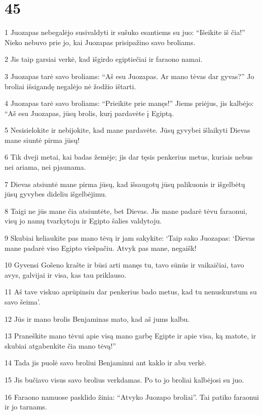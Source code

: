 \chapter{45}

\par 1 Juozapas nebegalėjo susivaldyti ir sušuko esantiems su juo: “Išeikite iš čia!” Nieko nebuvo prie jo, kai Juozapas prisipažino savo broliams. 
\par 2 Jis taip garsiai verkė, kad išgirdo egiptiečiai ir faraono namai. 
\par 3 Juozapas tarė savo broliams: “Aš esu Juozapas. Ar mano tėvas dar gyvas?” Jo broliai išsigandę negalėjo nė žodžio ištarti. 
\par 4 Juozapas tarė savo broliams: “Prieikite prie manęs!” Jiems priėjus, jis kalbėjo: “Aš esu Juozapas, jūsų brolis, kurį pardavėte į Egiptą. 
\par 5 Nesisielokite ir nebijokite, kad mane pardavėte. Jūsų gyvybei išlaikyti Dievas mane siuntė pirma jūsų! 
\par 6 Tik dveji metai, kai badas žemėje; jis dar tęsis penkerius metus, kuriais nebus nei ariama, nei pjaunama. 
\par 7 Dievas atsiuntė mane pirma jūsų, kad išsaugotų jūsų palikuonis ir išgelbėtų jūsų gyvybes dideliu išgelbėjimu. 
\par 8 Taigi ne jūs mane čia atsiuntėte, bet Dievas. Jis mane padarė tėvu faraonui, visų jo namų tvarkytoju ir Egipto šalies valdytoju. 
\par 9 Skubiai keliaukite pas mano tėvą ir jam sakykite: ‘Taip sako Juozapas: ‘Dievas mane padarė viso Egipto viešpačiu. Atvyk pas mane, negaišk! 
\par 10 Gyvensi Gošeno krašte ir būsi arti manęs tu, tavo sūnūs ir vaikaičiai, tavo avys, galvijai ir visa, kas tau priklauso. 
\par 11 Aš tave viskuo aprūpinsiu dar penkerius bado metus, kad tu nenuskurstum su savo šeima’. 
\par 12 Jūs ir mano brolis Benjaminas mato, kad aš jums kalbu. 
\par 13 Praneškite mano tėvui apie visą mano garbę Egipte ir apie visa, ką matote, ir skubiai atgabenkite čia mano tėvą!” 
\par 14 Tada jis puolė savo broliui Benjaminui ant kaklo ir abu verkė. 
\par 15 Jis bučiavo visus savo brolius verkdamas. Po to jo broliai kalbėjosi su juo. 
\par 16 Faraono namuose pasklido žinia: “Atvyko Juozapo broliai”. Tai patiko faraonui ir jo tarnams. 
